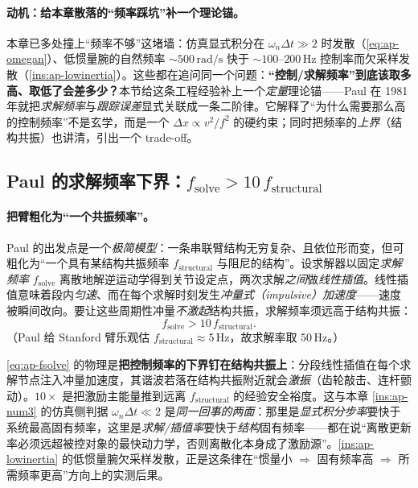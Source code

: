 \paragraph{动机：给本章散落的“频率踩坑”补一个理论锚。}
本章已多处撞上“频率不够”这堵墙：仿真显式积分在 $\omega_n\Delta t\gg2$ 时发散（\cref{eq:ap-omegan}）、低惯量腕的自然频率 $\sim500\,\mathrm{rad/s}$ 快于 $\sim100$--$200\,\mathrm{Hz}$ 控制率而欠采样发散（\cref{ins:ap-lowinertia}）。这些都在追问同一个问题：\textbf{“控制/求解频率”到底该取多高、取低了会差多少？}本节给这条工程经验补上一个\emph{定量}理论锚——Paul 在 1981 年就把\emph{求解频率}与\emph{跟踪误差}显式关联成一条二阶律\cite{paul1981robot}。它解释了“为什么需要那么高的控制频率”不是玄学，而是一个 $\Delta x\propto v^2/f^2$ 的硬约束；同时把频率的\emph{上界}（结构共振）也讲清，引出一个 trade-off。

\subsection{Paul 的求解频率下界：$f_{\mathrm{solve}}>10\,f_{\mathrm{structural}}$}
\label{sec:ap-fsolve-bound}

\paragraph{把臂粗化为“一个共振频率”。}
Paul 的出发点是一个\emph{极简模型}：一条串联臂结构无穷复杂、且依位形而变，但可粗化为“一个具有某结构共振频率 $f_{\mathrm{structural}}$ 与阻尼的结构”。设求解器以固定\emph{求解频率} $f_{\mathrm{solve}}$ 离散地解逆运动学得到关节设定点，两次求解\emph{之间}做\emph{线性插值}。线性插值意味着段内\emph{匀速}、而在每个求解时刻发生\emph{冲量式（impulsive）加速度}——速度被瞬间改向。要让这些周期性冲量\emph{不激起}结构共振，求解频率须远高于结构共振：
\begin{equation}
  f_{\mathrm{solve}} > 10\,f_{\mathrm{structural}}.
  \label{eq:ap-fsolve}
\end{equation}
（Paul 给 Stanford 臂乐观估 $f_{\mathrm{structural}}\approx5\,\mathrm{Hz}$，故求解率取 $50\,\mathrm{Hz}$。）

\begin{insight}\label{ins:ap-fsolve-resonance}
\cref{eq:ap-fsolve} 的物理是\textbf{把控制频率的下界钉在结构共振上}：分段线性插值在每个求解节点注入冲量加速度，其谐波若落在结构共振附近就会\emph{激振}（齿轮敲击、连杆颤动）。$10\times$ 是把激励主能量推到远离 $f_{\mathrm{structural}}$ 的经验安全裕度。这与本章 \cref{ins:ap-num3} 的仿真侧判据 $\omega_n\Delta t\ll2$ 是\emph{同一回事的两面}：那里是\emph{显式积分步率}要快于系统最高固有频率，这里是\emph{求解/插值率}要快于\emph{结构}固有频率——都在说“离散更新率必须远超被控对象的最快动力学，否则离散化本身成了激励源”。\cref{ins:ap-lowinertia} 的低惯量腕欠采样发散，正是这条律在“惯量小 $\Rightarrow$ 固有频率高 $\Rightarrow$ 所需频率更高”方向上的实测后果。
\end{insight}

